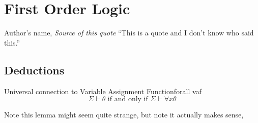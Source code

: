 
\chapter{First Order Logic}

\begin{chapquote}{Author's name, \textit{Source of this quote}}
``This is a quote and I don't know who said this.''
\end{chapquote}

\section{Deductions}

\begin{lemma}{Universal connection to Variable Assignment Function}{forall vaf}
    \[
    \Sigma \vdash \theta \text { if and only if } \Sigma \vdash \forall x \theta
    \]
\end{lemma}

Note this lemma might seem quite strange, but note it actually makes sense, 

